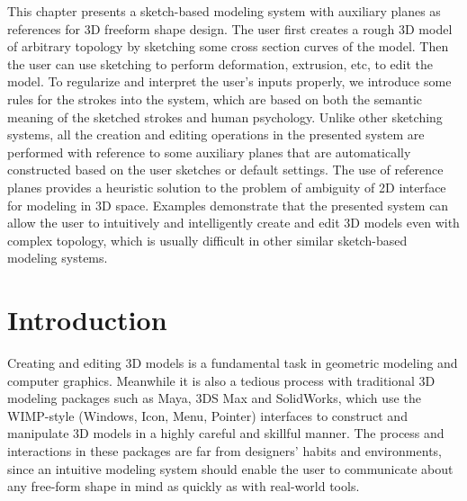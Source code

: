 This chapter presents a sketch-based modeling system with auxiliary planes as references for 3D freeform shape design. The user first creates a rough 3D model of arbitrary topology by sketching some cross section curves of the model. Then the user can use sketching to perform deformation, extrusion, etc, to edit the model. To regularize and interpret the user's inputs properly, we introduce some rules for the strokes into the system, which are based on both the semantic meaning of the sketched strokes and human psychology. Unlike other sketching systems, all the creation and editing operations in the presented system are performed with reference to some auxiliary planes that are automatically constructed based on the user sketches or default settings. The use of reference planes provides a heuristic solution to the problem of ambiguity of 2D interface for modeling in 3D space. Examples demonstrate that the presented system can allow the user to intuitively and intelligently create and edit 3D models even with complex topology, which is usually difficult in other similar sketch-based modeling systems.



\section{Introduction}\label{ch3:sec:intro}

Creating and editing 3D models is a fundamental task in geometric modeling and computer graphics. Meanwhile it is also a tedious process with traditional 3D modeling packages such as Maya, 3DS Max and SolidWorks, which use the WIMP-style (Windows, Icon, Menu, Pointer) interfaces to construct and manipulate 3D models in a highly careful and skillful manner. The process and interactions in these packages are far from designers' habits and environments, since an intuitive modeling system should enable the user to communicate about any free-form shape in mind as quickly as with real-world
tools. 

